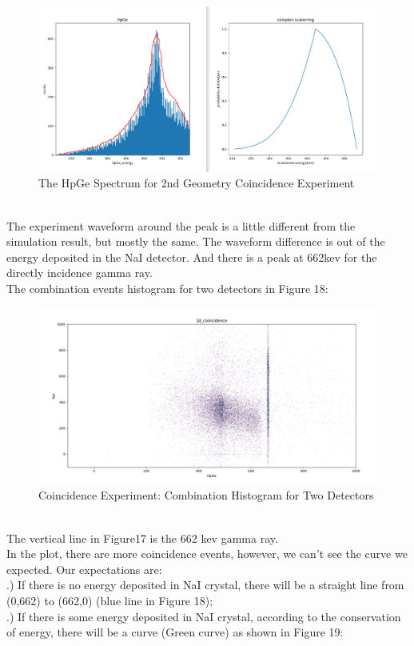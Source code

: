 \documentclass[12pt]{article}
\begin{document}
	\begin{figure}[h]
		\centering
		\includegraphics[width=0.7\linewidth, height=0.2\textheight]{pic/compration_HPGe_simulation}
		\caption{The HpGe Spectrum for 2nd Geometry Coincidence Experiment}
		\label{fig:comprationhpgesimulation}
	\end{figure}\\
	The experiment waveform around the peak is a little different from the simulation result, but mostly the same. The waveform  difference is out of the energy deposited in the NaI detector. And there is a peak at 662kev for the directly incidence gamma ray.\\
	The combination events histogram for two detectors in Figure 18:\\
	\begin{figure}[h]
		\centering
		\includegraphics[width=0.7\linewidth, height=0.4\textheight]{pic/Coin_hist_2nd_Geo}
		\caption{Coincidence Experiment: Combination Histogram for Two Detectors}
		\label{fig:coinhist2ndgeo}
	\end{figure}\\
	The vertical line in Figure17 is the 662 kev gamma ray. \\ 
	In the plot, there are more coincidence events, however, we can't see the curve we expected. Our expectations are:\\
	.) If there is no energy deposited in NaI crystal, there will be a straight line from (0,662) to (662,0) (blue line in Figure 18);\\
	.) If there is some energy deposited in NaI crystal, according to the conservation of energy, there will be a curve (Green curve) as shown in Figure 19:
\end{document}
